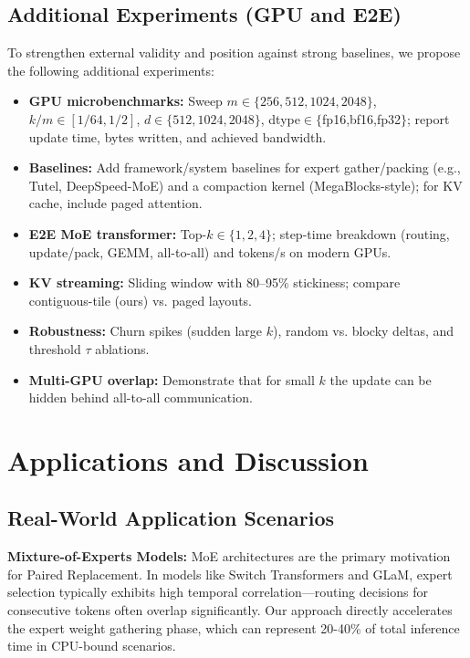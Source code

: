 \documentclass{article}
\numberwithin{equation}{section}
\theoremstyle{plain}
\theoremstyle{definition}
\theoremstyle{remark}
\begin{document}
\subsection{Additional Experiments (GPU and E2E)}

To strengthen external validity and position against strong baselines, we propose the following additional experiments:
\begin{itemize}
  \item \textbf{GPU microbenchmarks:} Sweep $m\in\{256,512,1024,2048\}$, $k/m\in[1/64,1/2]$, $d\in\{512,1024,2048\}$, dtype$\in\{$fp16,bf16,fp32$\}$; report update time, bytes written, and achieved bandwidth.
  \item \textbf{Baselines:} Add framework/system baselines for expert gather/packing (e.g., Tutel, DeepSpeed-MoE) and a compaction kernel (MegaBlocks-style); for KV cache, include paged attention.
  \item \textbf{E2E MoE transformer:} Top-$k\in\{1,2,4\}$; step-time breakdown (routing, update/pack, GEMM, all-to-all) and tokens/s on modern GPUs.
  \item \textbf{KV streaming:} Sliding window with 80–95\% stickiness; compare contiguous-tile (ours) vs. paged layouts.
  \item \textbf{Robustness:} Churn spikes (sudden large $k$), random vs. blocky deltas, and threshold $\tau$ ablations.
  \item \textbf{Multi-GPU overlap:} Demonstrate that for small $k$ the update can be hidden behind all-to-all communication.
\end{itemize}

\section{Applications and Discussion} \label{sec:applications}

\subsection{Real-World Application Scenarios}

\textbf{Mixture-of-Experts Models:} MoE architectures are the primary motivation for Paired Replacement. In models like Switch Transformers and GLaM, expert selection typically exhibits high temporal correlation—routing decisions for consecutive tokens often overlap significantly. Our approach directly accelerates the expert weight gathering phase, which can represent 20-40\% of total inference time in CPU-bound scenarios.
\end{document}
